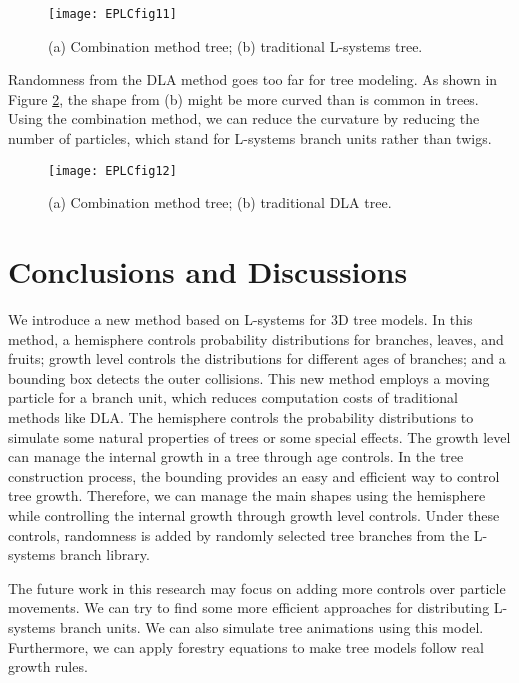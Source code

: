 \begin{figure}[!t]
\centering
\texttt{[image: EPLCfig11]}
\caption[3D tree model compared to L-system. ]{(a) Combination method tree; (b) traditional L-systems tree.}
\label{fig:EPLCfig11}
\end{figure} 

Randomness from the DLA method goes too far for tree modeling. As shown in Figure \ref{fig:EPLCfig12}, the shape from (b) might be more curved than is common in trees. Using the combination method, we can reduce the curvature by reducing the number of particles, which stand for L-systems branch units rather than twigs. 

\begin{figure}[!t]
\centering
\texttt{[image: EPLCfig12]}
\caption[3D tree model compared to DLA. ]{(a) Combination method tree; (b) traditional DLA tree.}
\label{fig:EPLCfig12}
\end{figure} 

\section{Conclusions and Discussions} 

We introduce a new method based on L-systems for 3D tree models. In this method, a hemisphere controls probability distributions for branches, leaves, and fruits; growth level controls the distributions for different ages of branches; and a bounding box detects the outer collisions. This new method employs a moving particle for a branch unit, which reduces computation costs of traditional methods like DLA. The hemisphere controls the probability distributions to simulate some natural properties of trees or some special effects. The growth level can manage the internal growth in a tree through age controls. In the tree construction process, the bounding provides an easy and efficient way to control tree growth. Therefore, we can manage the main shapes using the hemisphere while controlling the internal growth through growth level controls. Under these controls, randomness is added by randomly selected tree branches from the L-systems branch library.

The future work in this research may focus on adding more controls over particle movements. We can try to find some more efficient approaches for distributing L-systems branch units. We can also simulate tree animations using this model. Furthermore, we can apply forestry equations to make tree models follow real growth rules.

